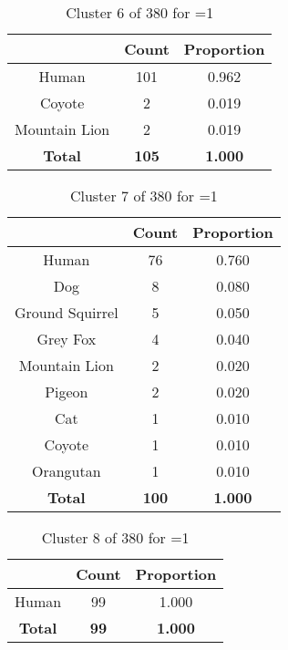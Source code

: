 \begin{table}[ht!]
\centering
\begin{tabular}{|c|c|c|}
\hline
\bf \Spec{} &\bf Count &\bf Proportion\\ \hline \hline
Human & 101 & 0.962\\ \hline
Coyote & 2 & 0.019\\ \hline
Mountain Lion & 2 & 0.019\\ \hline
\hline
\bf Total & \bf 105 & \bf 1.000\\ \hline
\end{tabular}
\label{tab:cluster:6:1}
\caption{Cluster 6 of 380 for \minneigh{}=1}
\end{table}

\begin{table}[ht!]
\centering
\begin{tabular}{|c|c|c|}
\hline
\bf \Spec{} &\bf Count &\bf Proportion\\ \hline \hline
Human & 76 & 0.760\\ \hline
Dog & 8 & 0.080\\ \hline
Ground Squirrel & 5 & 0.050\\ \hline
Grey Fox & 4 & 0.040\\ \hline
Mountain Lion & 2 & 0.020\\ \hline
Pigeon & 2 & 0.020\\ \hline
Cat & 1 & 0.010\\ \hline
Coyote & 1 & 0.010\\ \hline
Orangutan & 1 & 0.010\\ \hline
\hline
\bf Total & \bf 100 & \bf 1.000\\ \hline
\end{tabular}
\label{tab:cluster:7:1}
\caption{Cluster 7 of 380 for \minneigh{}=1}
\end{table}

\begin{table}[ht!]
\centering
\begin{tabular}{|c|c|c|}
\hline
\bf \Spec{} &\bf Count &\bf Proportion\\ \hline \hline
Human & 99 & 1.000\\ \hline
\hline
\bf Total & \bf 99 & \bf 1.000\\ \hline
\end{tabular}
\label{tab:cluster:8:1}
\caption{Cluster 8 of 380 for \minneigh{}=1}
\end{table}

